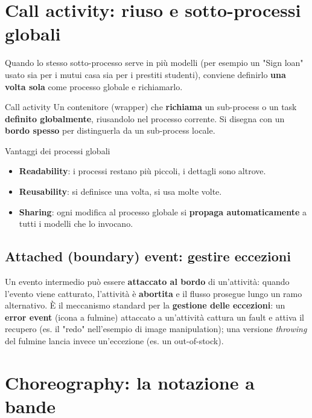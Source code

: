 \section{\texorpdfstring{Call activity: riuso e sotto-processi globali}{Call activity: riuso e sotto-processi globali}}

Quando lo stesso sotto-processo serve in più modelli (per esempio un "Sign loan" usato sia per i mutui casa sia per i prestiti studenti), conviene definirlo \textbf{una volta sola} come processo globale e richiamarlo.

\begin{boxdefinition}{Call activity}
Un contenitore (wrapper) che \textbf{richiama} un sub-process o un task \textbf{definito globalmente}, riusandolo nel processo corrente. Si disegna con un \textbf{bordo spesso} per distinguerla da un sub-process locale.
\end{boxdefinition}

\begin{boxtip}{Vantaggi dei processi globali}
\begin{itemize}
\item \textbf{Readability}: i processi restano più piccoli, i dettagli sono altrove.
\item \textbf{Reusability}: si definisce una volta, si usa molte volte.
\item \textbf{Sharing}: ogni modifica al processo globale si \textbf{propaga automaticamente} a tutti i modelli che lo invocano.
\end{itemize}
\end{boxtip}

\subsection{\texorpdfstring{Attached (boundary) event: gestire eccezioni}{Attached (boundary) event: gestire eccezioni}}

Un evento intermedio può essere \textbf{attaccato al bordo} di un'attività: quando l'evento viene catturato, l'attività è \textbf{abortita} e il flusso prosegue lungo un ramo alternativo. È il meccanismo standard per la \textbf{gestione delle eccezioni}: un \textbf{error event} (icona a fulmine) attaccato a un'attività cattura un fault e attiva il recupero (es. il "redo" nell'esempio di image manipulation); una versione \emph{throwing} del fulmine lancia invece un'eccezione (es. un out-of-stock).

\section{\texorpdfstring{Choreography: la notazione a bande}{Choreography: la notazione a bande}}

